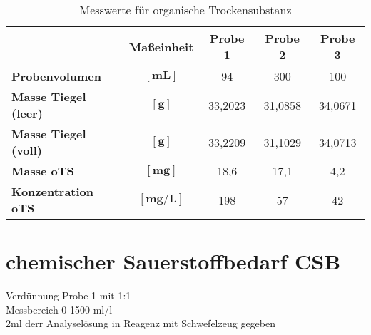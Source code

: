 \vspace*{-2.5mm}
\renewcommand{\arraystretch}{1.2}
\begin{table}[h!]
	\centering
	\caption{Messwerte für organische Trockensubstanz}
	\label{tab:ots}
	\begin{tabulary}{1.7\textwidth}{L|C|CCC}
		\hline
		& \textbf{Maßeinheit}&	\textbf{Probe 1} & \textbf{Probe 2} & \textbf{Probe 3}  \\ 
		\hline
		\textbf{Probenvolumen}& $\boldsymbol{\left[\si{\milli \liter}\right]}$ & 94 	& 300 	& 100\\
		\textbf{Masse Tiegel (leer)} &  $\boldsymbol{\left[\si{\gram}\right]}$ & 33,2023 & 31,0858 & 34,0671\\
		\textbf{Masse Tiegel (voll)}& $\boldsymbol{\left[\si{\gram}\right]}$	& 33,2209 & 31,1029 & 34,0713\\
		\hline
		\textbf{Masse oTS} & $\boldsymbol{\left[\si{\milli \gram}\right]}$& 18,6 & 17,1 & 4,2\\
		\hline
		\textbf{Konzentration oTS}&$\boldsymbol{\left[\si{\milli \gram \per \liter}\right]}$& 198 & 57 & 42 \\
		\hline
	\end{tabulary}
\end{table}
\FloatBarrier
\vspace*{-2.5mm}


\section{chemischer Sauerstoffbedarf CSB}
Verdünnung Probe 1 mit 1:1\\
Messbereich 0-1500 ml/l\\
2ml derr Analyselösung in Reagenz mit Schwefelzeug gegeben


